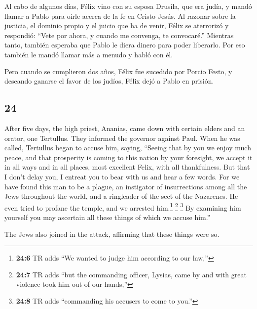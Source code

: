 \begin{paracol}{2}
 Al cabo de algunos días, Félix vino con su esposa
Drusila, que era judía, y mandó llamar a Pablo para oírle acerca de la
fe en Cristo Jesús.  Al razonar sobre la justicia, el
dominio propio y el juicio que ha de venir, Félix se aterrorizó y
respondió: ``Vete por ahora, y cuando me convenga, te convocaré.''
 Mientras tanto, también esperaba que Pablo le diera
dinero para poder liberarlo. Por eso también le mandó llamar más a
menudo y habló con él.

 Pero cuando se cumplieron dos años, Félix fue sucedido
por Porcio Festo, y deseando ganarse el favor de los judíos, Félix dejó
a Pablo en prisión.

\switchcolumn
\begin{otherlanguage}{english}

\hypertarget{section-47}{%
\section{24}\label{section-47}}

 After five days, the high priest, Ananias, came down with
certain elders and an orator, one Tertullus. They informed the governor
against Paul.  When he was called, Tertullus began to
accuse him, saying, ``Seeing that by you we enjoy much peace, and that
prosperity is coming to this nation by your foresight,  we
accept it in all ways and in all places, most excellent Felix, with all
thankfulness.  But that I don't delay you, I entreat you
to bear with us and hear a few words.  For we have found
this man to be a plague, an instigator of insurrections among all the
Jews throughout the world, and a ringleader of the sect of the
Nazarenes.  He even tried to profane the temple, and we
arrested him.\footnote{\textbf{24:6} TR adds ``We wanted to judge him
  according to our law,''}  \footnote{\textbf{24:7} TR
  adds ``but the commanding officer, Lysias, came by and with great
  violence took him out of our hands,''}  \footnote{\textbf{24:8}
  TR adds ``commanding his accusers to come to you.''} By examining him
yourself you may ascertain all these things of which we accuse him.''

 The Jews also joined in the attack, affirming that these
things were so.


\end{otherlanguage}
\end{paracol}
